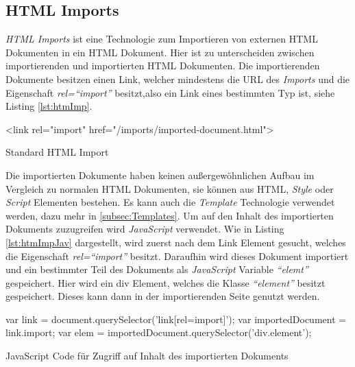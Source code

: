 \documentclass[12pt, paper=a4, bibtotoc, toc=listof]{scrreprt}
\begin{document}
			\subsection{HTML Imports}
			\emph{\ac{HTML} Imports} ist eine Technologie zum Importieren von externen \ac{HTML} Dokumenten in ein \ac{HTML} Dokument. Hier ist zu unterscheiden zwischen importierenden und importierten \ac{HTML} Dokumenten. Die importierenden Dokumente besitzen einen Link, welcher mindestens die \ac{URL} des \emph{Imports} und die Eigenschaft \emph{rel=\enquote{import}} besitzt,also ein Link eines bestimmten Typ ist, siehe Listing \ref{lst:htmImp}. 
				\begin{listing}
				\begin{HTMLcode*}{}
 <link rel="import" href="/imports/imported-document.html">
				\end{HTMLcode*}
				\caption{Standard HTML Import}
				\label{lst:htmImp}
				\end{listing}
			Die importierten Dokumente haben keinen außergewöhnlichen Aufbau im Vergleich zu normalen \ac{HTML} Dokumenten, sie können aus \ac{HTML}, \emph{Style} oder \emph{Script} Elementen bestehen. Es kann auch die \emph{Template} Technologie verwendet werden, dazu mehr in \ref{subsec:Templates}.
			Um auf den Inhalt des importierten Dokuments zuzugreifen wird \emph{JavaScript} verwendet. Wie in Listing \ref{lst:htmImpJav} dargestellt, wird zuerst nach dem Link Element gesucht, welches die Eigenschaft \emph{rel=\enquote{import}} besitzt. Daraufhin wird dieses Dokument importiert und ein bestimmter Teil des Dokuments als \emph{JavaScript} Variable \emph{\enquote{elemt}} gespeichert. Hier wird ein \ac{div} Element, welches die Klasse \emph{\enquote{element}} besitzt gespeichert. Dieses kann dann in der importierenden Seite genutzt werden. 
			\begin{listing}
			\begin{JavaScriptcode*}{}
var link = document.querySelector('link[rel=import]');
var importedDocument = link.import;
var elem = importedDocument.querySelector('div.element');
			\end{JavaScriptcode*}
			\caption{JavaScript Code für Zugriff auf Inhalt des importierten Dokuments}
			\label{lst:htmImpJav}
			\end{listing} 
			
\end{document}

